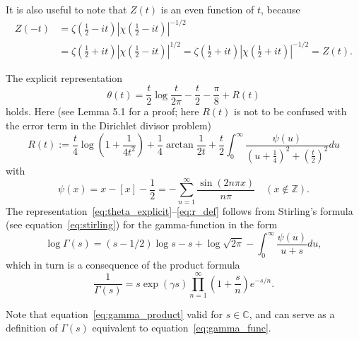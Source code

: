 \documentclass[11pt]{article}
\begin{document}
It is also useful to note that $Z(t)$ is an even function of $t$, because
\begin{align}\label{eq:hardy_even}
Z(-t) &= \zeta\left(\frac{1}{2} - it\right) \left| \chi\left(\frac{1}{2} - it\right) \right|^{-1/2} \\
&= \zeta\left(\frac{1}{2} + it\right) \left| \chi\left(\frac{1}{2} - it\right) \right|^{1/2} = \zeta\left(\frac{1}{2} + it\right) \left| \chi\left(\frac{1}{2} + it\right) \right|^{-1/2} = Z(t). \nonumber
\end{align}

The explicit representation
\begin{equation}\label{eq:theta_explicit}
\theta(t) = \frac{t}{2} \log \frac{t}{2\pi} - \frac{t}{2} - \frac{\pi}{8} + R(t)
\end{equation}
holds. Here (see Lemma 5.1 for a proof; here $R(t)$ is not to be confused with the error term in the Dirichlet divisor problem)
\begin{equation}\label{eq:r_def}
R(t) := \frac{t}{4} \log\left(1 + \frac{1}{4t^2}\right) + \frac{1}{4} \arctan \frac{1}{2t} + \frac{t}{2} \int_0^{\infty} \frac{\psi(u)}{(u + \frac{1}{4})^2 + (\frac{t}{2})^2} du
\end{equation}
with
\begin{equation}\label{eq:psi_def}
\psi(x) = x - [x] - \frac{1}{2} = -\sum_{n=1}^{\infty} \frac{\sin(2n\pi x)}{n\pi} \quad (x \notin \mathbb{Z}).
\end{equation}
The representation~\eqref{eq:theta_explicit}--\eqref{eq:r_def} follows from Stirling's formula (see equation~\eqref{eq:stirling}) for the gamma-function in the form
\begin{equation}\label{eq:stirling_log}
\log \Gamma(s) = (s - 1/2) \log s - s + \log \sqrt{2\pi} - \int_0^{\infty} \frac{\psi(u)}{u + s} du,
\end{equation}
which in turn is a consequence of the product formula
\begin{equation}\label{eq:gamma_product}
\frac{1}{\Gamma(s)} = s \exp(\gamma s) \prod_{n=1}^{\infty} \left(1 + \frac{s}{n}\right) e^{-s/n}.
\end{equation}

Note that equation~\eqref{eq:gamma_product} valid for $s \in \mathbb{C}$, and can serve as a definition of $\Gamma(s)$ equivalent to equation~\eqref{eq:gamma_func}.
\end{document}
